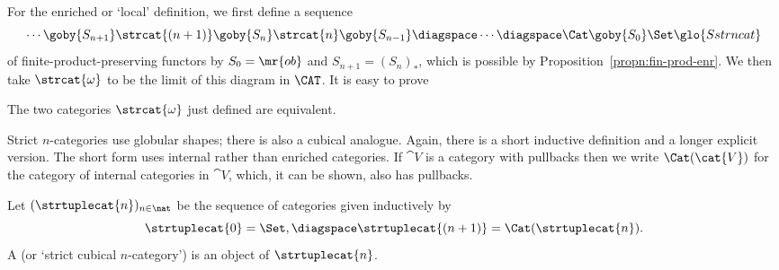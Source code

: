 For the enriched or `local' definition, we first define a sequence
\[
\label{p:forgetful-strict-n}
\cdots 
\goby{S_{n+1}} 
\strcat{(n+1)}
\goby{S_n}
\strcat{n}
\goby{S_{n-1}}
\diagspace
\cdots
\diagspace
\Cat
\goby{S_0}
\Set%
% 
\glo{Sstrncat}
%
\]
of finite-product-preserving functors by $S_0 = \mr{ob}$ and $S_{n+1} =
(S_n)_*$, which is possible by
Proposition~\ref{propn:fin-prod-enr}.  We then
take $\strcat{\omega}$ to be the limit of this diagram in $\CAT$.  It is
easy to prove
%
\begin{propn}
The two categories $\strcat{\omega}$ just defined are equivalent.
\done
\end{propn}


Strict $n$-categories use globular shapes; there is also a cubical
analogue.  Again, there is a short inductive definition and a longer
explicit version.  The short form uses internal rather than enriched
categories.  If $\cat{V}$ is a category with pullbacks then we write
$\Cat(\cat{V})$%
% 
%
for the category of internal%
%
%
categories in $\cat{V}$,
which, it can be shown, also has pullbacks.  
%
\begin{defn}
Let $(\strtuplecat{n})_{n\in\nat}$ be the sequence of categories given
inductively by
\[
\strtuplecat{0} = \Set,
\diagspace
\strtuplecat{(n+1)} = \Cat(\strtuplecat{n}).
\]
A %
%
%
(or `strict cubical
$n$-category') is an object of $\strtuplecat{n}$. 
\end{defn}

